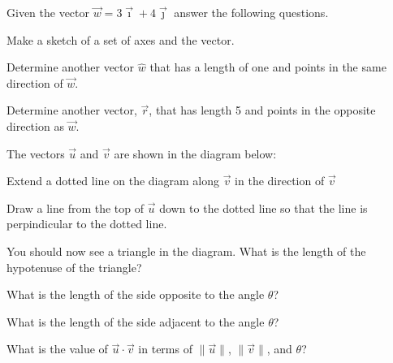 \begin{problem}
  \item Given the vector $\vec{w}=3\vec{\imath} +4 \vec{\jmath}$ answer the following questions.

    \begin{subproblem}
        \item Make a sketch of a set of axes and the vector.
        \vfill
        \item Determine another vector $\hat{w}$ that has a length of one and points in the same direction of $\vec{w}$.
        \vfill
        \item Determine another vector, $\vec{r}$, that has length 5 and points in the opposite direction as $\vec{w}$.
        \vfill
    \end{subproblem}

    \clearpage

  \item The vectors $\vec{u}$ and $\vec{v}$ are shown in the diagram below:


  \begin{subproblem}
    \item Extend a dotted line on the diagram along $\vec{v}$ in the direction of $\vec{v}$
    \item Draw a line from the top of $\vec{u}$ down to the dotted line so that the line is perpindicular to the dotted line.
    \item You should now see a triangle in the diagram. What is the length of the hypotenuse of the triangle?
      \vfill
    \item What is the length of the side opposite to the angle $\theta$?
      \vfill
    \item What is the length of the side adjacent to the angle $\theta$?
      \vfill

      \clearpage

    \item What is the value of $\vec{u}\cdot\vec{v}$ in terms of $\|\vec{u}\|$, $\|\vec{v}\|$, and $\theta$?
      \vfill


\end{subproblem}
\end{problem}
